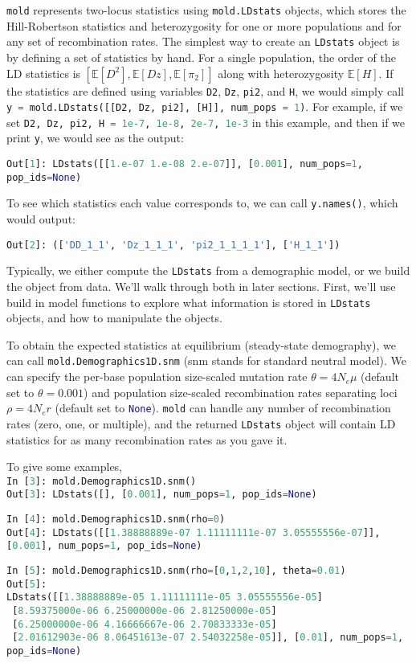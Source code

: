 \documentclass[11pt]{article}
\makeatletter
\newcommand{\mold}{\texttt{mold}\xspace}
\newcommand{\py}[1]{\lstinline[breaklines=true,language=Python, showstringspaces=False]@#1@}
\newcommand{\E}{\mathbb{E}}
\makeatother
\begin{document}
\mold represents two-locus statistics using \py{mold.LDstats} objects, which stores the Hill-Robertson statistics and heterozygosity for one or more populations and for any set of recombination rates.
The simplest way to create an \py{LDstats} object is by defining a set of statistics by hand.
For a single population, the order of the LD statistics is $[\E[D^2], \E[Dz], \E[\pi_2]]$ along with heterozygosity $\E[H]$.
If the statistics are defined using variables \py{D2}, \py{Dz}, \py{pi2}, and \py{H}, we would simply call \py{y = mold.LDstats([[D2, Dz, pi2], [H]], num_pops = 1)}.
For example, if we set \py{D2, Dz, pi2, H = 1e-7, 1e-8, 2e-7, 1e-3} in this example, and then if we print \py{y}, we would see as the output:

\py{Out[1]: LDstats([[1.e-07 1.e-08 2.e-07]], [0.001], num_pops=1, pop_ids=None)}

To see which statistics each value corresponds to, we can call \py{y.names()}, which would output:

\py{Out[2]: (['DD_1_1', 'Dz_1_1_1', 'pi2_1_1_1_1'], ['H_1_1'])}

Typically, we either compute the \py{LDstats} from a demographic model, or we build the object from data.
We'll walk through both in later sections.
First, we'll use build in model functions to explore what information is stored in \py{LDstats} objects, and how to manipulate the objects.

To obtain the expected statistics at equilibrium (steady-state demography), we can call \py{mold.Demographics1D.snm} (snm stands for standard neutral model).
We can specify the per-base population size-scaled mutation rate $\theta = 4N_e\mu$ (default set to $\theta=0.001$) and population size-scaled recombination rates separating loci $\rho=4 N_e r$ (default set to \py{None}).
\mold can handle any number of recombination rates (zero, one, or multiple), and the returned \py{LDstats} object will contain LD statistics for as many recombination rates as you gave it.

To give some examples,\\
\py{In [3]: mold.Demographics1D.snm()}\\
\py{Out[3]: LDstats([], [0.001], num_pops=1, pop_ids=None)}

\py{In [4]: mold.Demographics1D.snm(rho=0)}\\
\py{Out[4]: LDstats([[1.38888889e-07 1.11111111e-07 3.05555556e-07]], [0.001], num_pops=1, pop_ids=None)}

\py{In [5]: mold.Demographics1D.snm(rho=[0,1,2,10], theta=0.01)}\\
\py{Out[5]:}\\
\py{LDstats([[1.38888889e-05 1.11111111e-05 3.05555556e-05]}\\
\py{ [8.59375000e-06 6.25000000e-06 2.81250000e-05]}\\
\py{ [6.25000000e-06 4.16666667e-06 2.70833333e-05]}\\
\py{ [2.01612903e-06 8.06451613e-07 2.54032258e-05]], [0.01], num_pops=1, pop_ids=None)}
\end{document}
